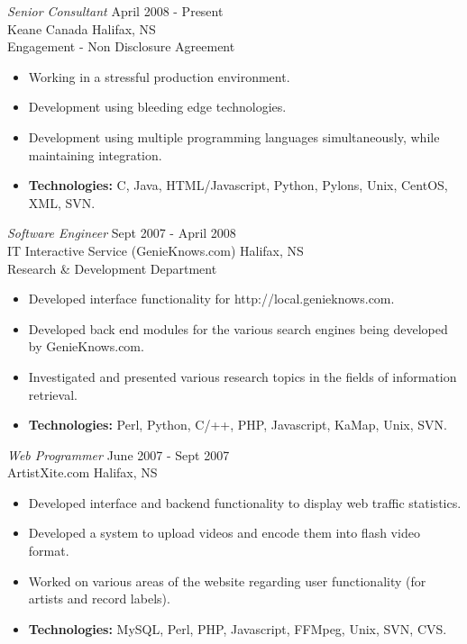\documentclass[line,margin]{res}
\begin{document}
\begin{resume}
   {\sl Senior Consultant} \hfill April 2008 - Present \\
    Keane Canada \hfill Halifax, NS \\
    Engagement - Non Disclosure Agreement \smallskip
    \begin{itemize}  \itemsep -2pt %
     \item Working in a stressful production environment.
     \item Development using bleeding edge technologies.
     \item Development using multiple programming languages
            simultaneously, while maintaining integration.
     \item {\bf Technologies:} \hspace{1pt} 
        C, Java, HTML/Javascript, Python, Pylons, Unix, CentOS, \newline 
        \hspace*{72pt} XML, SVN.
    \end{itemize}

   {\sl Software Engineer} \hfill Sept 2007 - April 2008 \\
    IT Interactive Service (GenieKnows.com) \hfill Halifax, NS \\
    Research {\&} Development Department \smallskip
    \begin{itemize}  \itemsep -2pt %
     \item Developed interface functionality for
             http://local.genieknows.com.
     \item Developed back end modules for the various search
             engines being developed by GenieKnows.com.
     \item Investigated and presented various research topics
             in the fields of information retrieval.
     \item {\bf Technologies:} \hspace{1pt} 
        Perl, Python, C/++, PHP, Javascript, KaMap, Unix, SVN.
    \end{itemize}

   {\sl Web Programmer} \hfill June 2007 - Sept 2007 \\
    ArtistXite.com \hfill Halifax, NS \smallskip
    \begin{itemize}  \itemsep -2pt %
     \item Developed interface and backend functionality to display 
               web traffic statistics.
     \item Developed a system to upload videos and encode them
                into flash video format.
     \item Worked on various areas of the website regarding user 
               functionality (for artists and record labels).
     \item {\bf Technologies:}\hspace{4pt} 
        MySQL, Perl, PHP, Javascript, FFMpeg, Unix, SVN, CVS.
    \end{itemize}


\end{resume}
\end{document}
